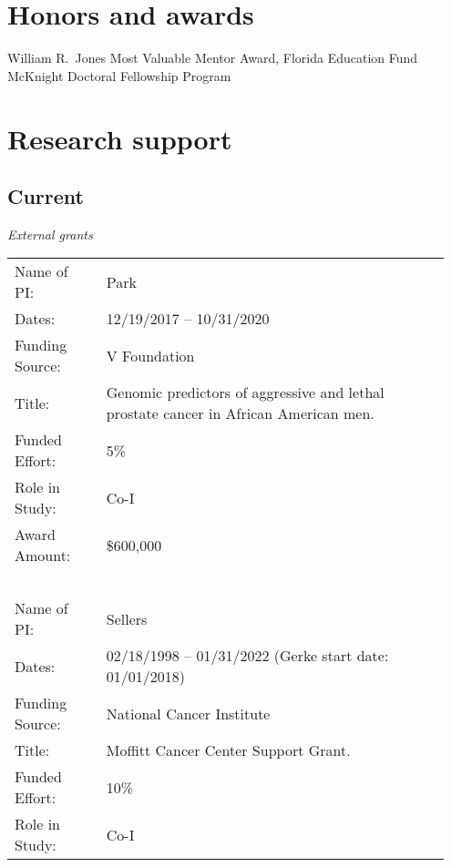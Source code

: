 \documentclass[11pt, a4paper]{article} %
\newcommand{\years}[1]{\marginnote{\scriptsize \raise .3ex\hbox{#1}}} %
\begin{document}
\section*{Honors and awards}
\years{2016} William R.\ Jones Most Valuable Mentor Award, Florida Education Fund McKnight Doctoral Fellowship Program

\section*{Research support}
\subsection*{Current}
\emph{External grants}
\begin{longtable}{@{}p{0.2\linewidth} p{0.75\linewidth}}
Name of PI: & Park \\
Dates: & 12/19/2017 -- 10/31/2020\\
Funding Source: & V Foundation\\
Title: & Genomic predictors of aggressive and lethal prostate cancer in African American men.\\
Funded Effort: & 5\%\\
Role in Study: & Co-I \\
Award Amount: & \$600,000\\
~\\
Name of PI: & Sellers \\
Dates: & 02/18/1998 -- 01/31/2022 (Gerke start date: 01/01/2018)\\
Funding Source: & National Cancer Institute\\
Title: & Moffitt Cancer Center Support Grant.\\
Funded Effort: & 10\%\\
Role in Study: & Co-I \\
\end{longtable}
\end{document}
